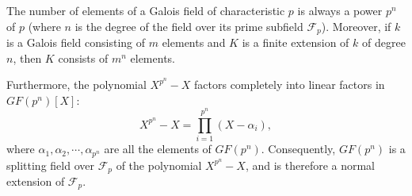 The number of elements of a Galois field of characteristic $p$ is always a power $p^n$ of $p$ (where $n$ is the degree of the field over its prime subfield $\mathcal{F}_p$). Moreover, if $k$ is a Galois field consisting of $m$ elements and $K$ is a finite extension of $k$ of degree $n$, then $K$ consists of $m^n$ elements.

Furthermore, the polynomial $X^{p^n} - X$ factors completely into linear factors in $GF(p^n)[X]$:
\[
X^{p^n} - X = \prod_{i=1}^{p^n} (X - \alpha_i),
\]
where $\alpha_1, \alpha_2, \cdots, \alpha_{p^n}$ are all the elements of $GF(p^n)$. Consequently, $GF(p^n)$ is a splitting field over $\mathcal{F}_p$ of the polynomial $X^{p^n} - X$, and is therefore a normal extension of $\mathcal{F}_p$.
